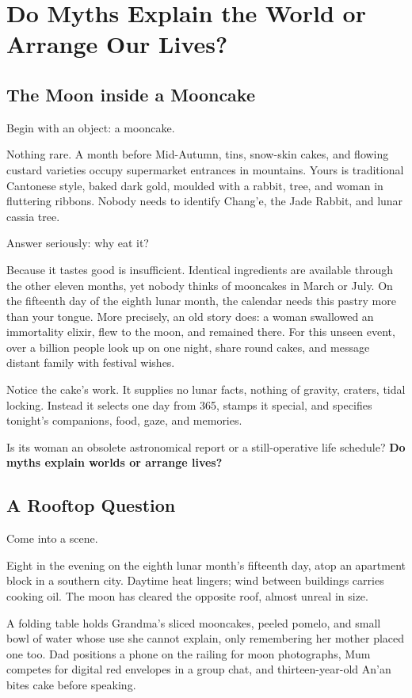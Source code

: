 \chapter[Myths, Worlds, and Lives]{Do Myths Explain the World or Arrange Our Lives?}
\section{The Moon inside a Mooncake}
Begin with an object: a mooncake.

Nothing rare. A month before Mid-Autumn, tins, snow-skin cakes, and flowing custard varieties occupy supermarket entrances in mountains. Yours is traditional Cantonese style, baked dark gold, moulded with a rabbit, tree, and woman in fluttering ribbons. Nobody needs to identify Chang'e, the Jade Rabbit, and lunar cassia tree.

Answer seriously: why eat it?

Because it tastes good is insufficient. Identical ingredients are available through the other eleven months, yet nobody thinks of mooncakes in March or July. On the fifteenth day of the eighth lunar month, the calendar needs this pastry more than your tongue. More precisely, an old story does: a woman swallowed an immortality elixir, flew to the moon, and remained there. For this unseen event, over a billion people look up on one night, share round cakes, and message distant family with festival wishes.

Notice the cake's work. It supplies no lunar facts, nothing of gravity, craters, tidal locking. Instead it selects one day from 365, stamps it special, and specifies tonight's companions, food, gaze, and memories.

Is its woman an obsolete astronomical report or a still-operative life schedule? \textbf{Do myths explain worlds or arrange lives?}

\section{A Rooftop Question}
Come into a scene.

Eight in the evening on the eighth lunar month's fifteenth day, atop an apartment block in a southern city. Daytime heat lingers; wind between buildings carries cooking oil. The moon has cleared the opposite roof, almost unreal in size.

A folding table holds Grandma's sliced mooncakes, peeled pomelo, and small bowl of water whose use she cannot explain, only remembering her mother placed one too. Dad positions a phone on the railing for moon photographs, Mum competes for digital red envelopes in a group chat, and thirteen-year-old An'an bites cake before speaking.

